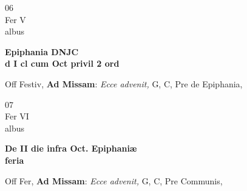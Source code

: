 \documentclass[10pt, openany]{book}
\begin{document}
        \begin{center}
            \begin{minipage}{3.5in}
                \vspace{2em}
                \begin{minipage}{0.5in}
                    {\Huge 06} \\
                    {\normalsize Fer V} \\
                    {\normalsize albus}
                \end{minipage}
                \begin{minipage}{3.0in}
                    \textbf{ \large Epiphania DNJC \\
                    \textnormal{\normalsize d I cl cum Oct privil 2 ord}} \\ 
                \end{minipage}
                \begin{justify}Off Festiv, \textbf{Ad Missam}: \textit{Ecce advenit,} G, C, Pre de Epiphania,  
                \end{justify}
            \end{minipage}
        \end{center}
    
        \begin{center}
            \begin{minipage}{3.5in}
                \vspace{2em}
                \begin{minipage}{0.5in}
                    {\Huge 07} \\
                    {\normalsize Fer VI} \\
                    {\normalsize albus}
                \end{minipage}
                \begin{minipage}{3.0in}
                    \textbf{ \large De II die infra Oct. Epiphaniæ \\
                    \textnormal{\normalsize feria}} \\ 
                \end{minipage}
                \begin{justify}Off Fer, \textbf{Ad Missam}: \textit{Ecce advenit,} G, C, Pre Communis,  
                \end{justify}
            \end{minipage}
        \end{center}
    
\end{document}
